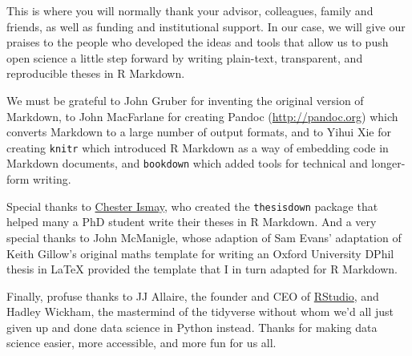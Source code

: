 \documentclass[a4paper, nobind]{templates/ociamthesis}
\begin{document}
\setcounter{secnumdepth}{2}
\setcounter{tocdepth}{1}



\begin{romanpages}

\maketitle




\begin{acknowledgements}
 	This is where you will normally thank your advisor, colleagues, family and friends, as well as funding and institutional support. In our case, we will give our praises to the people who developed the ideas and tools that allow us to push open science a little step forward by writing plain-text, transparent, and reproducible theses in R Markdown.

 We must be grateful to John Gruber for inventing the original version of Markdown, to John MacFarlane for creating Pandoc (\url{http://pandoc.org}) which converts Markdown to a large number of output formats, and to Yihui Xie for creating \texttt{knitr} which introduced R Markdown as a way of embedding code in Markdown documents, and \texttt{bookdown} which added tools for technical and longer-form writing.

 Special thanks to \href{http://chester.rbind.io}{Chester Ismay}, who created the \texttt{thesisdown} package that helped many a PhD student write their theses in R Markdown. And a very special thanks to John McManigle, whose adaption of Sam Evans' adaptation of Keith Gillow's original maths template for writing an Oxford University DPhil thesis in LaTeX provided the template that I in turn adapted for R Markdown.

 Finally, profuse thanks to JJ Allaire, the founder and CEO of \href{http://rstudio.com}{RStudio}, and Hadley Wickham, the mastermind of the tidyverse without whom we'd all just given up and done data science in Python instead. Thanks for making data science easier, more accessible, and more fun for us all.


\end{acknowledgements}
\end{romanpages}
\end{document}
